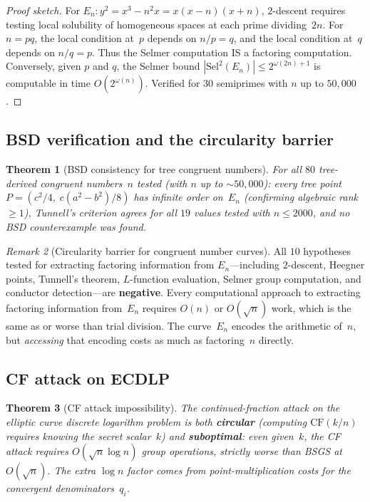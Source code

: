\documentclass[12pt]{amsart}
\newtheorem{theorem}{Theorem}[section]
\theoremstyle{definition}
\theoremstyle{remark}
\newtheorem{remark}[theorem]{Remark}
\begin{document}
\begin{proof}[Proof sketch]
For $E_{n}:y^{2}=x^{3}-n^{2}x=x(x-n)(x+n)$, $2$-descent requires testing
local solubility of homogeneous spaces at each prime dividing~$2n$.  For
$n=pq$, the local condition at~$p$ depends on $n/p=q$, and the local condition
at~$q$ depends on $n/q=p$.  Thus the Selmer computation IS a factoring
computation.  Conversely, given $p$ and $q$, the Selmer bound
$|\mathrm{Sel}^{2}(E_{n})|\le2^{\omega(2n)+1}$ is computable in time
$O(2^{\omega(n)})$.  Verified for $30$ semiprimes with $n$ up to $50{,}000$.
\end{proof}

\subsection{BSD verification and the circularity barrier}

\begin{theorem}[BSD consistency for tree congruent numbers]\label{thm:bsd-verify}
For all $80$ tree-derived congruent numbers~$n$ tested (with $n$ up to
$\sim50{,}000$): every tree point $P=(c^{2}/4,\;c(a^{2}-b^{2})/8)$ has
infinite order on~$E_{n}$ (confirming algebraic rank $\ge1$), Tunnell's
criterion agrees for all $19$ values tested with $n\le2000$, and no BSD
counterexample was found.
\end{theorem}

\begin{remark}[Circularity barrier for congruent number curves]
All $10$ hypotheses tested for extracting factoring information from
$E_{n}$---including $2$-descent, Heegner points, Tunnell's theorem,
$L$-function evaluation, Selmer group computation, and conductor
detection---are \textbf{negative}.  Every computational approach to extracting
factoring information from~$E_{n}$ requires $O(n)$ or $O(\sqrt{n})$ work,
which is the same as or worse than trial division.  The curve~$E_{n}$ encodes
the arithmetic of~$n$, but \emph{accessing} that encoding costs as much as
factoring~$n$ directly.
\end{remark}

\subsection{CF attack on ECDLP}

\begin{theorem}[CF attack impossibility]\label{thm:cf-ecdlp}
The continued-fraction attack on the elliptic curve discrete logarithm problem
is both \textbf{circular} (computing $\mathrm{CF}(k/n)$ requires knowing the
secret scalar~$k$) and \textbf{suboptimal}: even given~$k$, the CF attack
requires $O(\sqrt{n}\log n)$ group operations, strictly worse than BSGS at
$O(\sqrt{n})$.  The extra $\log n$ factor comes from point-multiplication costs
for the convergent denominators~$q_{i}$.
\end{theorem}
\end{document}
